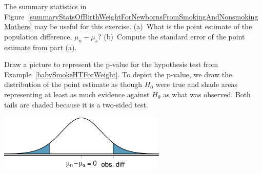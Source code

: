 \begin{exercisewrap}
\begin{nexercise}
The summary statistics in Figure~\ref{summaryStatsOfBirthWeightForNewbornsFromSmokingAndNonsmokingMothers} may be useful for this exercise. (a)~What is the point estimate of the population difference, $\mu_{n} - \mu_{s}$? (b)~Compute the standard error of the point estimate from part (a).\footnotemark{}
\end{nexercise}
\end{exercisewrap}

\begin{examplewrap}
\begin{nexample}{Draw a picture to represent the p-value for the hypothesis test from Example~\ref{babySmokeHTForWeight}.} \label{pictureOfPValueForEstimateOfDiffOfMeansOfBirthWeights}
To depict the p-value, we draw the distribution of the point estimate as though $H_0$ were true and shade areas representing at least as much evidence against $H_0$ as what was observed. Both tails are shaded because it is a two-sided test.
\begin{center}
\includegraphics[width=0.6\textwidth]{ch_inference_for_means/figures/distOfDiffOfSampleMeansForBWOfBabySmokeData/distOfDiffOfSampleMeansForBWOfBabySmokeData}
\end{center}
\end{nexample}
\end{examplewrap}


